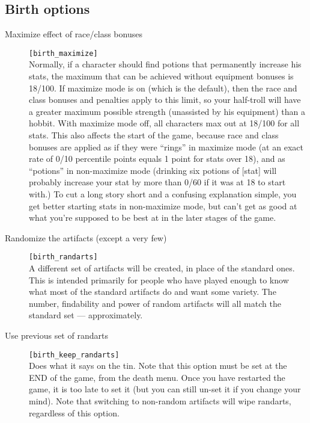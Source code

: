 \subsection{Birth options}
\begin{description}
\item[Maximize effect of race/class bonuses] \verb+[birth_maximize]+\\
     Normally, if a character should find potions that permanently increase
     his stats, the maximum that can be achieved without equipment bonuses
     is 18/100. If maximize mode is on (which is the default), then the race
     and class bonuses and penalties apply to this limit, so your half-troll
     will have a greater maximum possible strength (unassisted by his
     equipment) than a hobbit. With maximize mode off, all characters max
     out at 18/100 for all stats. This also affects the start of the game,
     because race and class bonuses are applied as if they were
     ``rings'' in
     maximize mode (at an exact rate of 0/10 percentile points equals 1 point
     for stats over 18), and as ``potions'' in non-maximize mode (drinking six
     potions of [stat] will probably increase your stat by more than 0/60 if
     it was at 18 to start with.) To cut a long story short and a confusing
     explanation simple, you get better starting stats in non-maximize mode,
     but can't get as good at what you're supposed to be best at in the later
     stages of the game.

\item[Randomize the artifacts (except a very few)]
    \verb+[birth_randarts]+\\
     A different set of artifacts will be created, in place of the standard
     ones. This is intended primarily for people who have played enough to
     know what most of the standard artifacts do and want some variety. The
     number, findability and power of random artifacts will all match the
     standard set --- approximately.

\item[Use previous set of randarts] \verb+[birth_keep_randarts]+\\
     Does what it says on the tin. Note that this option must be set at the
     END of the game, from the death menu. Once you have restarted the game,
     it is too late to set it (but you can still un-set it if you change your
     mind). Note that switching to non-random artifacts will wipe randarts,
     regardless of this option.


\end{description}
